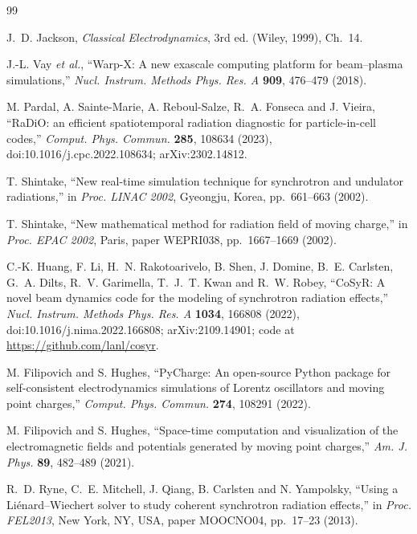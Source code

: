 \documentclass[11pt, a4paper]{article}
\begin{document}
{\small
\begin{thebibliography}{99}
\setlength{\itemsep}{0pt}

J.~D. Jackson, \textit{Classical Electrodynamics}, 3rd ed. (Wiley, 1999), Ch.~14.

J.-L. Vay \textit{et al.}, ``Warp-X: A new exascale computing platform for beam--plasma simulations,'' \textit{Nucl. Instrum. Methods Phys. Res. A} \textbf{909}, 476--479 (2018).

M. Pardal, A. Sainte-Marie, A. Reboul-Salze, R.~A. Fonseca and J. Vieira, ``RaDiO: an efficient spatiotemporal radiation diagnostic for particle-in-cell codes,'' \textit{Comput. Phys. Commun.} \textbf{285}, 108634 (2023), doi:10.1016/j.cpc.2022.108634; arXiv:2302.14812.

T. Shintake, ``New real-time simulation technique for synchrotron and undulator radiations,'' in \textit{Proc. LINAC 2002}, Gyeongju, Korea, pp.~661--663 (2002).

T. Shintake, ``New mathematical method for radiation field of moving charge,'' in \textit{Proc. EPAC 2002}, Paris, paper WEPRI038, pp.~1667--1669 (2002).

C.-K. Huang, F. Li, H.~N. Rakotoarivelo, B. Shen, J. Domine, B.~E. Carlsten, G.~A. Dilts, R.~V. Garimella, T.~J.~T. Kwan and R.~W. Robey, ``CoSyR: A novel beam dynamics code for the modeling of synchrotron radiation effects,'' \textit{Nucl. Instrum. Methods Phys. Res. A} \textbf{1034}, 166808 (2022), doi:10.1016/j.nima.2022.166808; arXiv:2109.14901; code at \url{https://github.com/lanl/cosyr}.

M. Filipovich and S. Hughes, ``PyCharge: An open-source Python package for self-consistent electrodynamics simulations of Lorentz oscillators and moving point charges,'' \textit{Comput. Phys. Commun.} \textbf{274}, 108291 (2022).

M. Filipovich and S. Hughes, ``Space-time computation and visualization of the electromagnetic fields and potentials generated by moving point charges,'' \textit{Am. J. Phys.} \textbf{89}, 482--489 (2021).

R.~D. Ryne, C.~E. Mitchell, J. Qiang, B. Carlsten and N. Yampolsky, ``Using a Li\'enard--Wiechert solver to study coherent synchrotron radiation effects,'' in \textit{Proc. FEL2013}, New York, NY, USA, paper MOOCNO04, pp.~17--23 (2013).


\end{thebibliography}}
\end{document}
